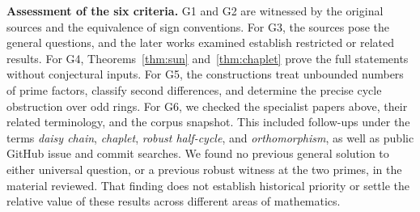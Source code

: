 \documentclass[11pt,a4paper]{article}
\begin{document}
\par
\noindent\textbf{Assessment of the six criteria.}
G1 and G2 are witnessed by the original sources and the equivalence of sign conventions. For G3, the sources pose the general questions, and the later works examined establish restricted or related results. For G4, Theorems~\ref{thm:sun} and~\ref{thm:chaplet} prove the full statements without conjectural inputs. For G5, the constructions treat unbounded numbers of prime factors, classify second differences, and determine the precise cycle obstruction over odd rings. For G6, we checked the specialist papers above, their related terminology, and the corpus snapshot. This included follow-ups under the terms \emph{daisy chain}, \emph{chaplet}, \emph{robust half-cycle}, and \emph{orthomorphism}, as well as public GitHub issue and commit searches. We found no previous general solution to either universal question, or a previous robust witness at the two primes, in the material reviewed. That finding does not establish historical priority or settle the relative value of these results across different areas of mathematics.
\end{document}
